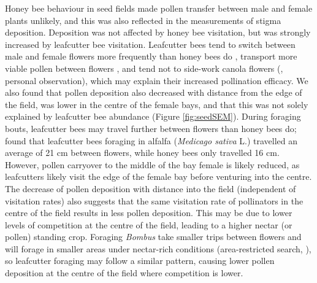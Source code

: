 \documentclass[12pt, draft]{article} %
\begin{document}
Honey bee behaviour in seed fields made pollen transfer between male and female plants unlikely, and this was also reflected in the measurements of stigma deposition. 
Deposition was not affected by honey bee visitation, but was strongly increased by leafcutter bee visitation.
Leafcutter bees tend to switch between male and female flowers more frequently than honey bees do \citep{waytesMsc}, transport more viable pollen between flowers \citep{parker2015}, and tend not to side-work canola flowers (\citealp{soroka2001}, personal observation), which may explain their increased pollination efficacy.
We also found that pollen deposition also decreased with distance from the edge of the field, was lower in the centre of the female bays, and that this was not solely explained by leafcutter bee abundance (Figure \ref{fig:seedSEM}).
During foraging bouts, leafcutter bees may travel further between flowers than honey bees do; \citet{brunet2019} found that leafcutter bees foraging in alfalfa (\emph{Medicago sativa} L.) travelled an average of 21 cm between flowers, while honey bees only travelled 16 cm.
However, pollen carryover \citep{thomson1986} to the middle of the bay female is likely reduced, as leafcutters likely visit the edge of the female bay before venturing into the centre.
The decrease of pollen deposition with distance into the field (independent of visitation rates) also suggests that the same visitation rate of pollinators in the centre of the field results in less pollen deposition.
This may be due to lower levels of competition at the centre of the field, leading to a higher nectar (or pollen) standing crop. %
Foraging \textit{Bombus} take smaller trips between flowers and will forage in smaller areas under nectar-rich conditions (area-restricted search, \citealp{pyke1978b, heinrich1979}), so leafcutter foraging may follow a similar pattern, causing lower pollen deposition at the centre of the field where competition is lower.
\end{document}
